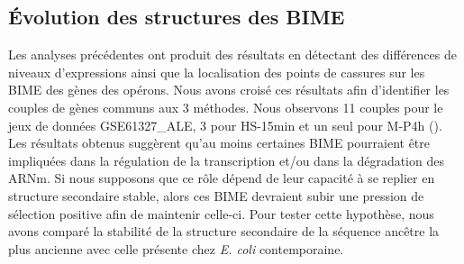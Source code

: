 \documentclass[12pt,a4paper]{report}
\begin{document}
\begin{onehalfspace}
\section*{Évolution des structures des BIME}

Les analyses précédentes ont produit des résultats en détectant des différences de niveaux d'expressions ainsi que la localisation des points de cassures sur les BIME des gènes des opérons. Nous avons croisé ces résultats afin d'identifier les couples de gènes communs aux 3 méthodes. Nous observons 11 couples pour le jeux de données GSE61327\_ALE, 3 pour HS-15min et un seul pour M-P4h ().
Les résultats obtenus suggèrent qu’au moins certaines BIME pourraient être impliquées dans la régulation de la transcription et/ou dans la dégradation des ARNm. Si nous supposons que ce rôle dépend de leur capacité à se replier en structure secondaire stable, alors ces BIME devraient subir une pression de sélection positive afin de maintenir celle-ci. Pour tester cette hypothèse, nous avons comparé la stabilité de la structure secondaire de la séquence ancêtre la plus ancienne avec celle présente chez \textit{E. coli} contemporaine.


\end{onehalfspace}
\end{document}
